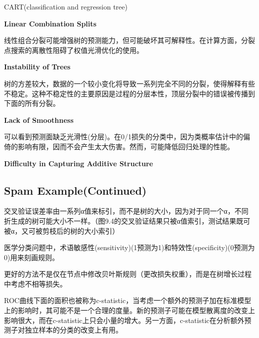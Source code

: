             CART(classification and regression tree)

            {\color{blue} \bf{Linear Combination Splits}}

            线性组合分裂可能增强树的预测能力，但可能破坏其可解释性。在计算方面，分裂点搜索的离散性阻碍了权值光滑优化的使用。

            {\color{blue} \bf{Instability of Trees}}

            树的方差较大，数据的一个较小变化将导致一系列完全不同的分裂，使得解释有些不稳定。这种不稳定性的主要原因是过程的分层本性，顶层分裂中的错误被传播到下面的所有分裂。

            {\color{blue} \bf{Lack of Smoothness}}

            可以看到预测面缺乏光滑性(分层)。在0/1损失的分类中，因为类概率估计中的偏倚的影响有限，因而不会产生太大伤害。然而，可能降低回归处理的性能。

            {\color{blue} \bf{Difficulty in Capturing Additive Structure}}
        \subsection{Spam Example(Continued)}
            交叉验证误差率由一系列α值来标引，而不是树的大小，因为对于同一个α，不同折生成的树可能大小不一样。（图9.4的交叉验证结果只被α值索引，测试结果既可被α，又可被剪枝后的树的大小索引）
            
            医学分类问题中，术语敏感性(sensitivity)(1预测为1)和特效性(specificity)(0预测为0)用来刻画规则。
            
            更好的方法不是仅在节点中修改贝叶斯规则（更改损失权重），而是在树增长过程中考虑不相等损失。
            
            ROC曲线下面的面积也被称为c-statistic，当考虑一个额外的预测子加在标准模型上的影响时，其可能不是一个合理的度量。新的预测子可能在模型散离度的改变上影响很大，而在c-statistic上只会小量的增大。另一方面，c-statistic在分析额外预测子对独立样本的分类的改变上有用。

